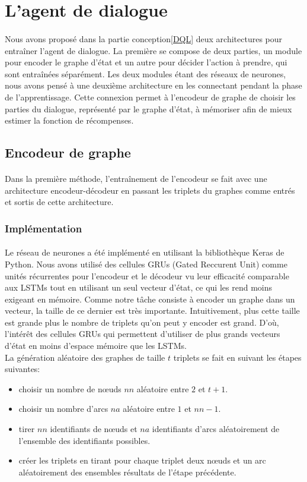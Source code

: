 \section{L'agent de dialogue}\label{DMReal}
\paragraph{}Nous avons proposé dans la partie conception\ref{DQL} deux architectures pour entraîner l'agent de dialogue. La première se compose de deux parties, un module pour encoder le graphe d'état et un autre pour décider l'action à prendre, qui sont entraînées séparément. Les deux modules étant des réseaux de neurones, nous avons pensé à une deuxième architecture en les connectant pendant la phase de l'apprentissage. Cette connexion permet à l'encodeur de graphe de choisir les parties du dialogue, représenté par le graphe d'état, à mémoriser afin de mieux estimer la fonction de récompenses.
\subsection{Encodeur de graphe}
\paragraph{}Dans la première méthode, l’entraînement de l'encodeur se fait avec une architecture encodeur-décodeur en passant les triplets du graphes comme entrés et sortis de cette architecture.
\subsubsection{Implémentation}
\paragraph{}Le réseau de neurones a été implémenté en utilisant la bibliothèque Keras de Python. Nous avons utilisé des cellules GRUs (Gated Reccurent Unit\cite{Cho2014}) comme unités récurrentes pour l'encodeur et le décodeur vu leur efficacité comparable aux LSTMs tout en utilisant un seul vecteur d'état, ce qui les rend moins exigeant en mémoire. Comme notre tâche consiste à encoder un graphe dans un vecteur, la taille de ce dernier est très importante. Intuitivement, plus cette taille est grande plus le nombre de triplets qu'on peut y encoder est grand. D'où, l’intérêt des cellules GRUs qui permettent d'utiliser de plus grands vecteurs d'état en moins d'espace mémoire que les LSTMs.\\
La génération aléatoire des graphes de taille $t$ triplets se fait en suivant les étapes suivantes:
\begin{itemize}
	\item choisir un nombre de n\oe{}uds $nn$ aléatoire entre $2$ et $t+1$.
	\item choisir un nombre d'arcs $na$ aléatoire entre $1$ et $nn-1$.
	\item tirer $nn$ identifiants de n\oe{}uds et $na$ identifiants d'arcs aléatoirement de l'ensemble des identifiants possibles.
	\item créer les triplets en tirant pour chaque triplet deux n\oe{}uds et un arc aléatoirement des ensembles résultats de l'étape précédente. 
\end{itemize}
